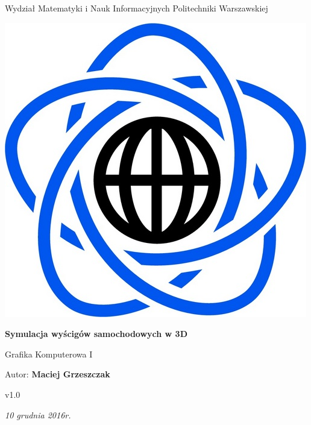 \documentclass[11pt]{article}
\begin{document}
\begin{titlepage}
\centering

{\large Wydział Matematyki i Nauk Informacyjnych Politechniki Warszawskiej}

\vspace{1cm}
\includegraphics[scale=0.15]{logo}
\vspace{3cm}

{\Huge\bfseries Symulacja wyścigów samochodowych w 3D}

\vspace{0.5cm}

{\Large Grafika Komputerowa I}
\vspace{2cm}

{\Large Autor: \textbf{Maciej Grzeszczak}}

\vspace{1cm}

{\large v1.0}

\vspace{1cm}

\vfill

{\itshape {\large 10 grudnia 2016r.}}
\end{titlepage}

\tableofcontents


\begin{table}[!h]
\centering
\def\arraystretch{2}%
\caption{Lista zmian}

\end{table}
\end{document}

